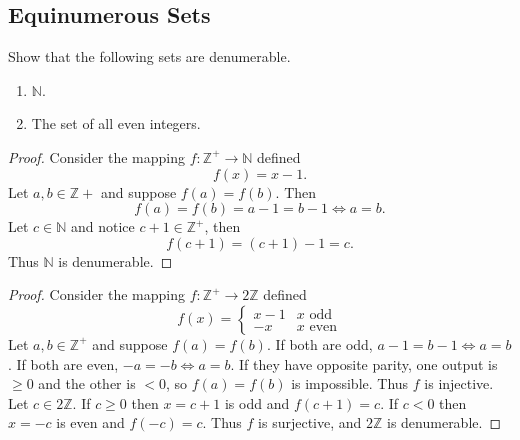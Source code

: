 \subsection{Equinumerous Sets}

\newpage
\begin{tcolorbox}[title=Problem 1, breakable]
    Show that the following sets are denumerable.
    \begin{enumerate}
        \item $\mathbb{N}$.
        \item The set of all even integers.
    \end{enumerate}
\end{tcolorbox}

\begin{proof}
    Consider the mapping $f : \mathbb{Z}^+ \longrightarrow \mathbb{N}$ defined 
    \[f(x) = x - 1.\]
    Let $a, b \in \mathbb{Z+}$ and suppose 
    $f(a) = f(b)$. Then 
    \[f(a) = f(b) = a - 1 = b - 1 \iff a = b.\]
    Let $c \in \mathbb{N}$ and notice $c + 1 \in \mathbb{Z}^+$, then 
    \[f(c + 1) = (c + 1) - 1 = c.\]
    Thus $\mathbb{N}$ is denumerable.
\end{proof}

\begin{proof}
    Consider the mapping $f : \mathbb{Z}^+ \longrightarrow 2\mathbb{Z}$ defined 
    \[f(x) = \begin{cases} x - 1 & x \text{ odd} \\ -x & x \text{ even} \end{cases}\]
    Let $a, b \in \mathbb{Z}^+$ and suppose $f(a) = f(b)$. If both are odd, 
        $a - 1 = b - 1 \iff a = b$. If both are even, $-a = -b \iff a = b$. 
    If they have opposite parity, one output is $\geq 0$ and the other 
        is $< 0$, so $f(a) = f(b)$ is impossible. 
    Thus $f$ is injective.
    Let $c \in 2\mathbb{Z}$. 
    If $c \geq 0$ then $x = c + 1$ 
        is odd and $f(c + 1) = c$. If $c < 0$ then $x = -c$ is even and $f(-c) = c$. 
    Thus $f$ is surjective, and $2\mathbb{Z}$ is denumerable.
\end{proof}